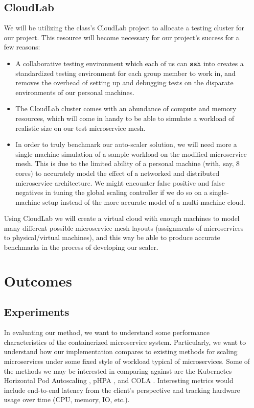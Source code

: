 \documentclass{proposal}
\begin{document}
\subsection{CloudLab}
We will be utilizing the class's CloudLab project to allocate a testing cluster for our project. This resource will become necessary for our project's success for a few reasons:
\begin{itemize}
    \item A collaborative testing environment which each of us can $\tt ssh$ into creates a standardized testing environment for each group member to work in, and removes the overhead of setting up and debugging tests on the disparate environments of our personal machines.
    \item The CloudLab cluster comes with an abundance of compute and memory resources, which will come in handy to be able to simulate a workload of realistic size on our test microservice mesh.
    \item In order to truly benchmark our auto-scaler solution, we will need more a single-machine simulation of a sample workload on the modified microservice mesh. This is due to the limited ability of a personal machine (with, say, 8 cores) to accurately model the effect of a networked and distributed microservice architecture. We might encounter false positive and false negatives in tuning the global scaling controller if we do so on a single-machine setup instead of the more accurate model of a multi-machine cloud.
\end{itemize}
Using CloudLab we will create a virtual cloud with enough machines to model many different possible microservice mesh layouts (assignments of microservices to physical/virtual machines), and this way be able to produce accurate benchmarks in the process of developing our scaler.

\section{Outcomes}\label{outcomes}
\subsection{Experiments}
In evaluating our method, we want to understand some performance characteristics of the containerized microservice system. Particularly, we want to understand how our implementation compares to existing methods for scaling microservices under some fixed style of workload typical of microservices. Some of the methods we may be interested in comparing against are the Kubernetes Horizontal Pod Autoscaling \cite{kubernetes_hpa}, pHPA \cite{choi_phpa}, and COLA \cite{sachi_cola}. Interesting metrics would include end-to-end latency from the client's perspective and tracking hardware usage over time (CPU, memory, IO, etc.). 
\end{document}

